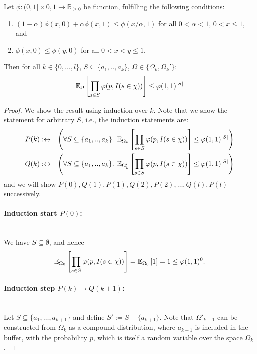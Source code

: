 \begin{lemma}
\label{le:neg_cor_prelim}
Let $\phi : (0,1] \times {0,1} \rightarrow \mathbb R_{\geq 0}$ be function, fulfilling the following
  conditions:
\begin{enumerate}
\item \label{cond:phi_1} $(1-\alpha) \phi(x,0) + \alpha \phi(x,1) \leq \phi(x/\alpha,1)$ for all
  $0 < \alpha < 1$, $0 < x \leq 1$, and
\item \label{cond:phi_2} $\phi(x,0) \leq \phi(y,0)$ for all $0 < x < y \leq 1$.
\end{enumerate}
Then for all 
$k \in \{0,\ldots,l\}$, $S \subseteq \{a_1,..,a_k\}$, $\Omega \in \{\Omega_k,\Omega_k'\}$:
\[
  \operatorname{\mathbb E}_{\Omega}\left[ \prod_{s \in S} \varphi(p, I(s \in \chi)) \right] \leq \varphi(1,1)^{|S|} 
\]
\end{lemma}
\begin{proof}
We show the result using induction over $k$. Note that we show the statement for arbitrary $S$,
i.e., the induction statements are:
\begin{eqnarray*}
P(k) & :\leftrightarrow & \left(\forall S \subseteq \{a_1,..,a_k\}. \;
  \operatorname{\mathbb E}_{\Omega_k}\left[ \prod_{s \in S} \varphi(p, I(s \in \chi)) \right]
    \leq \varphi(1,1)^{|S|} \right) \\
Q(k) & :\leftrightarrow & \left(\forall S \subseteq \{a_1,..,a_k\}. \; 
  \operatorname{\mathbb E}_{\Omega'_k}\left[ \prod_{s \in S} \varphi(p, I(s \in \chi)) \right]
    \leq \varphi(1,1)^{|S|} \right)
\end{eqnarray*}
and we will show $P(0),Q(1),P(1),Q(2),P(2),\ldots,Q(l),P(l)$ successively.
\paragraph{Induction start $P(0)$:} \phantom{.}\\
We have $S \subseteq \emptyset$, and hence
\[
\operatorname{\mathbb E}_{\Omega_0}\left[ \prod_{s \in S} \varphi(p, I(s \in \chi)) \right] =
\operatorname{\mathbb E}_{\Omega_0}\left[1\right] = 1 \leq \varphi(1,1)^0 \textrm{.}
\]
\paragraph{Induction step $P(k) \rightarrow Q(k+1)$:} \phantom{.}\\
Let $S \subseteq \{ a_1, \ldots, a_{k+1} \}$ and define $S' := S - \{ a_{k+1} \}$.
Note that $\Omega'_{k+1}$ can be constructed from $\Omega_k$ as a compound distribution, where
$a_{k+1}$ is included in the buffer, with the probability $p$, which is itself a random variable
over the space $\Omega_k$.


\end{proof}
